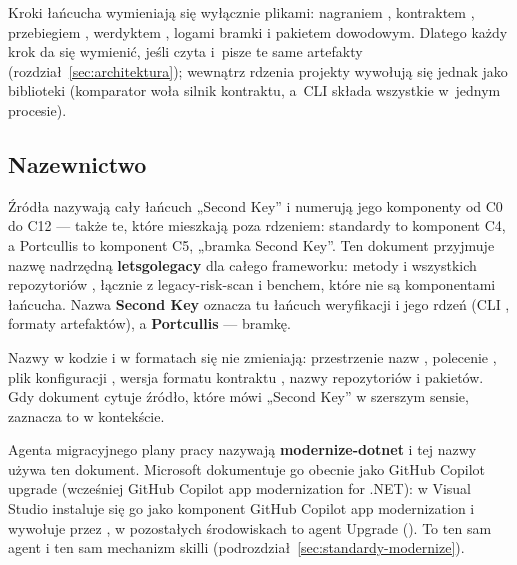 Kroki łańcucha wymieniają się wyłącznie plikami: nagraniem , kontraktem
, przebiegiem , werdyktem
, logami bramki  i pakietem dowodowym. Dlatego
każdy krok da się wymienić, jeśli czyta i~pisze te same artefakty
(rozdział~\ref{sec:architektura}); wewnątrz rdzenia projekty wywołują się jednak jako
biblioteki (komparator woła silnik kontraktu, a~CLI składa wszystkie w~jednym procesie).


\subsection{Nazewnictwo}\label{sec:wprowadzenie-nazwy}

Źródła nazywają cały łańcuch „Second Key” i numerują jego komponenty od C0 do C12 ---
także te, które mieszkają poza rdzeniem: standardy to komponent C4, a Portcullis to
komponent C5, „bramka Second Key”. Ten dokument przyjmuje nazwę nadrzędną
\textbf{letsgolegacy} dla całego frameworku: metody i wszystkich repozytoriów
, łącznie z legacy-risk-scan i benchem, które nie są
komponentami łańcucha. Nazwa \textbf{Second Key} oznacza tu łańcuch weryfikacji i jego
rdzeń (CLI , formaty artefaktów), a \textbf{Portcullis} --- bramkę.

Nazwy w kodzie i w formatach się nie zmieniają: przestrzenie nazw ,
polecenie , plik konfiguracji , wersja formatu
kontraktu , nazwy repozytoriów i pakietów. Gdy
dokument cytuje źródło, które mówi „Second Key” w szerszym sensie, zaznacza to w
kontekście.

Agenta migracyjnego plany pracy nazywają \textbf{modernize-dotnet} i tej nazwy używa ten
dokument. Microsoft dokumentuje go obecnie jako GitHub Copilot upgrade (wcześniej GitHub
Copilot app modernization for .NET): w Visual Studio instaluje się go jako komponent GitHub
Copilot app modernization i wywołuje przez , w pozostałych
środowiskach to agent Upgrade (). To ten sam agent i ten sam mechanizm
skilli (podrozdział~\ref{sec:standardy-modernize}).

